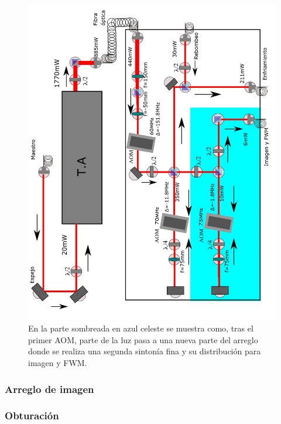 \documentclass[12pt,twoside]{article}
\begin{document}
\newpage
\begin{figure}[H]
    \begin{center}
        \includegraphics[width=1.1\linewidth]{amplificadoryAOM.png}
    \end{center}
    \caption{En la parte sombreada en azul celeste se muestra como, tras el primer AOM, parte de la luz pasa a una nueva parte del arreglo donde se realiza una segunda sintonía fina y su distribución para imagen y FWM.}
    \label{arreglaom}
\end{figure} 

\subsubsection{Arreglo de imagen}\label{Arreglo de imagen}

\subsubsection{Obturación}\label{obturacion}
\end{document}
